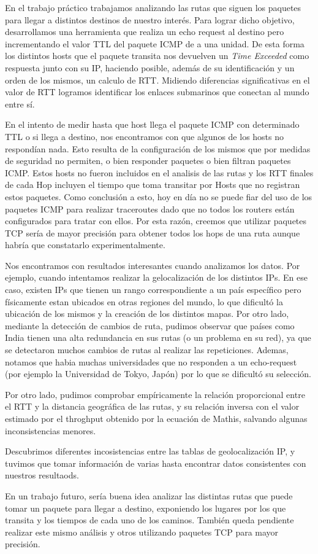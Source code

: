 En el trabajo práctico trabajamos analizando las rutas que siguen los paquetes para llegar a distintos destinos de nuestro interés. Para lograr dicho objetivo, desarrollamos una herramienta que realiza un echo request al destino pero incrementando el valor TTL del paquete ICMP de a una unidad. De esta forma los distintos hosts que el paquete transita nos devuelven un \textit{Time Exceeded} como respuesta junto con su IP, haciendo posible, además de su identificación y un orden de los mismos, un calculo de RTT. Midiendo diferencias significativas en el valor de RTT logramos identificar los enlaces submarinos que conectan al mundo entre sí.

En el intento de medir hasta que host llega el paquete ICMP con determinado TTL o si llega a destino, nos encontramos con que algunos de los hosts no respondían nada. Esto resulta de la configuración de los mismos que por medidas de seguridad no permiten, o bien responder paquetes o bien filtran paquetes ICMP. Estos hosts no fueron incluidos en el analisis de las rutas y los RTT finales de cada Hop incluyen el tiempo que toma transitar por Hosts que no registran estos paquetes. Como conclusión a esto, hoy en día no se puede fiar del uso de los paquetes ICMP para realizar traceroutes dado que no todos los routers están configurados para tratar con ellos. Por esta razón, creemos que utilizar paquetes TCP sería de mayor precisión para obtener todos los hops de una ruta aunque habría que constatarlo experimentalmente.

Nos encontramos con resultados interesantes cuando analizamos los datos. Por ejemplo, cuando intentamos realizar la gelocalización de los distintos IPs. En ese caso, existen IPs que tienen un rango correspondiente a un país específico pero físicamente estan ubicados en otras regiones del mundo, lo que dificultó la ubicación de los mismos y la creación de los distintos mapas. Por otro lado, mediante la detección de cambios de ruta, pudimos observar que países como India tienen una alta redundancia en sus rutas (o un problema en su red), ya que se detectaron muchos cambios de rutas al realizar las repeticiones. Ademas, notamos que habia muchas universidades que no responden a un echo-request (por ejemplo la Universidad de Tokyo, Japón) por lo que se dificultó su selección.

Por otro lado, pudimos comprobar empíricamente la relación proporcional entre el RTT y la distancia geográfica de las rutas, y su relación inversa con el valor estimado por el throghput obtenido por la ecuación de Mathis, salvando algunas inconsistencias menores.

Descubrimos diferentes incosistencias entre las tablas de geolocalización IP, y tuvimos que tomar información de varias hasta encontrar datos consistentes con nuestros resultaods.

En un trabajo futuro, sería buena idea analizar las distintas rutas que puede tomar un paquete para llegar a destino, exponiendo los lugares por los que transita y los tiempos de cada uno de los caminos. También queda pendiente realizar este mismo análisis y otros utilizando paquetes TCP para mayor precisión.
